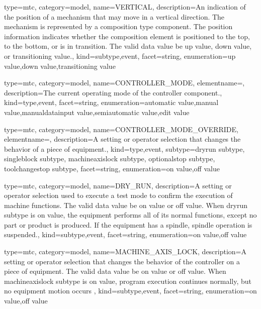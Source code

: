 {
  type=mtc,
  category=model,
  name={VERTICAL},
  description={An indication of the position of a mechanism that may move in a vertical direction. The mechanism is represented by a \gls{composition} type component. \newline The position information indicates whether the \gls{composition} element is positioned to the top, to the bottom, or is in transition.  \newline The \gls{valid data value} \must be \gls{up value}, \gls{down value}, or \gls{transitioning value}.},
  kind={subtype,event},
  facet={\gls{string}},
  enumeration={\gls{up value},\gls{down value},\gls{transitioning value}}
}


{
  type=mtc,
  category=model,
  name={CONTROLLER\_MODE},
  elementname=,
  description={The current operating mode of the \gls{controller} component.},
  kind={type,event},
  facet={\gls{string}},
  enumeration={\gls{automatic value},\gls{manual value},\gls{manualdatainput value},\gls{semiautomatic value},\gls{edit value}}
}


{
  type=mtc,
  category=model,
  name={CONTROLLER\_MODE\_OVERRIDE},
  elementname=,
  description={A setting or operator selection that changes the behavior of a piece of equipment.},
  kind={type,event},
  subtype={\gls{dryrun subtype}, \gls{singleblock subtype}, \gls{machineaxislock subtype}, \gls{optionalstop subtype}, \gls{toolchangestop subtype}},
  facet={\gls{string}},
  enumeration={\gls{on value},\gls{off value}}
}


{
  type=mtc,
  category=model,
  name={DRY\_RUN},
  description={A setting or operator selection used to execute a test mode to confirm the execution of machine functions. \newline The \gls{valid data value} \must be \gls{on value} or \gls{off value}. \newline When \gls{dryrun subtype} is \gls{on value}, the equipment performs all of its normal functions, except no part or product is produced.  If the equipment has a spindle, spindle operation is suspended.},
  kind={subtype,event},
  facet={\gls{string}},
  enumeration={\gls{on value},\gls{off value}}
}


{
  type=mtc,
  category=model,
  name={MACHINE\_AXIS\_LOCK},
  description={A setting or operator selection that changes the behavior of the controller on a piece of equipment. \newline The \gls{valid data value} \must be \gls{on value} or \gls{off value}. \newline When \gls{machineaxislock subtype} is \gls{on value}, program execution continues normally, but no equipment motion occurs },
  kind={subtype,event},
  facet={\gls{string}},
  enumeration={\gls{on value},\gls{off value}}
}


